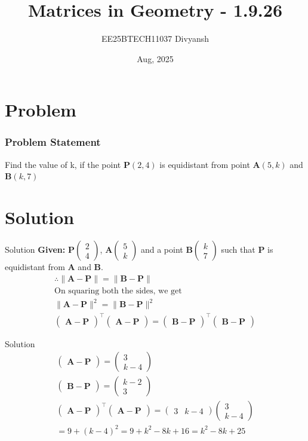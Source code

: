 \documentclass{beamer}
\title{Matrices in Geometry - 1.9.26}
\author{EE25BTECH11037  Divyansh}
\date{Aug, 2025}
\let\vec\mathbf
\providecommand{\brak}[1]{\ensuremath{\left(#1\right)}}
\theoremstyle{remark}
\providecommand{\norm}[1]{\lVert#1\rVert}
\newcommand{\myvec}[1]{\ensuremath{\begin{pmatrix}#1\end{pmatrix}}}
\begin{document}
\maketitle


\begin{frame}
\tableofcontents
\end{frame}


\section{Problem}
\begin{frame}
\frametitle{Problem Statement}
Find the value of k, if the point $\vec{P}\brak{2,4}$ is equidistant from point $\vec{A}\brak{5,k}$ and $\vec{B}\brak{k,7}$
\end{frame}

\section{Solution}
\begin{frame}{Solution}
   \textbf{Given: } 
$\vec{P}\myvec{2\\4}$, $\vec{A}\myvec{5\\k}$ and a point $\vec{B} \myvec{k \\ 7}$ such that $\vec{P}$ is equidistant from $\vec{A}$ and $\vec{B}$. 
\begin{align}
    \therefore \norm{\vec{A}-\vec{P}}=\norm{\vec{B}-\vec{P}}\\
    \text{On squaring both the sides, we get }\\
    \norm{\vec{A}-\vec{P}}^2=\norm{\vec{B}-\vec{P}}^2\\
    \myvec{\vec{A}-\vec{P}}^{\top}\myvec{\vec{A}-\vec{P}}=\myvec{\vec{B}-\vec{P}}^{\top}\myvec{\vec{B}-\vec{P}}
\end{align}
\end{frame}

\begin{frame}{Solution}
\begin{align}
    \myvec{\vec{A}-\vec{P}}=\myvec{3 \\ k-4}\\
    \myvec{\vec{B}-\vec{P}}=\myvec{k-2 \\ 3}\\
    \myvec{\vec{A}-\vec{P}}^{\top}\myvec{\vec{A}-\vec{P}}=\myvec{3 & k-4}\myvec{3 \\ k-4}\\=9+\brak{k-4}^2=9 + k^2 - 8k +16  =k^2 - 8k + 25
\end{align}
\end{frame}
\end{document}
